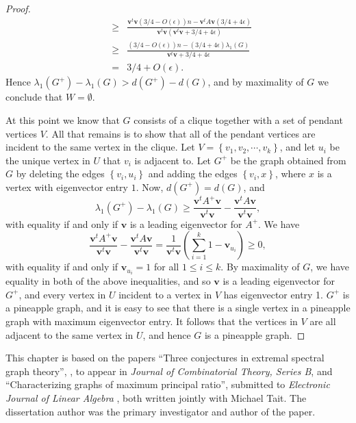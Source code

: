 \begin{proof}
\begin{eqnarray*}
 &\geq& \frac{\textbf{v}^t\textbf{v}(3/4-O(\epsilon))n - \textbf{v}^tA\textbf{v} (3/4 + 4\epsilon)}{\textbf{v}^t\textbf{v} (\textbf{v}^t\textbf{v} + 3/4 + 4\epsilon)}\\
 &\geq & \frac{(3/4-O(\epsilon))n - (3/4 + 4\epsilon)\lambda_1(G)}{\textbf{v}^t\textbf{v} + 3/4 + 4\epsilon} \\ 
 &= &  3/4 + O(\epsilon) .
\end{eqnarray*}
Hence $\lambda_1(G^+) - \lambda_1(G) > d(G^+) - d(G)$, and by maximality of $G$ we conclude that $W = \emptyset$.

At this point we know that $G$ consists of a clique together with a set of pendant vertices $V$.  All that remains is to show that all of the pendant vertices  are incident to the same vertex in the clique.  Let $V = \left\{v_1, v_2, \cdots, v_k\right\}$, and let $u_i$ be the unique vertex in $U$ that $v_i$ is adjacent to.  Let $G^+$ be the graph obtained from $G$ by deleting the edges $\left\{v_i,u_i\right\}$ and adding the edges $\left\{v_i,x\right\}$, where $x$ is a vertex with eigenvector entry $1$.  Now, $d(G^+) = d(G)$, and 
\[ \lambda_1(G^+) -\lambda_1(G) \geq \frac{\textbf{v}^t A^+ \textbf{v}}{\textbf{v}^t\textbf{v}} - \frac{\textbf{v}^t A \textbf{v}}{\textbf{v}^t\textbf{v}}, \]
with equality if and only if $\textbf{v}$ is a leading eigenvector for $A^+$.  We have
\[\frac{\textbf{v}^t A^+ \textbf{v}}{\textbf{v}^t\textbf{v}} - \frac{\textbf{v}^t A \textbf{v}}{\textbf{v}^t\textbf{v}} = \frac{1}{\textbf{v}^t\textbf{v}}\left( \sum_{i=1}^k 1 - \mathbf{v}_{u_i} \right) \geq 0 ,\]
with equality if and only if $\mathbf{v}_{u_i} = 1$ for all $1 \leq i \leq k$.  By maximality of $G$, we have equality in both of the above inequalities, and so $\textbf{v}$ is a leading eigenvector for $G^+$, and every vertex in $U$ incident to a vertex in $V$ has eigenvector entry 1.  $G^+$ is a pineapple graph, and it is easy to see that there is a single vertex in a pineapple graph with maximum eigenvector entry.  It follows that the vertices in $V$ are all adjacent to the same vertex in $U$, and hence $G$ is a pineapple graph.
\end{proof}


This chapter is based on the papers ``Three conjectures in extremal spectral graph theory'',
 \cite{TaitTobin2017}, to appear in \textit{Journal of Combinatorial Theory, Series B},
 and ``Characterizing graphs of maximum principal ratio'', submitted to
 \textit{Electronic Journal of Linear Algebra} \cite{TaitTobin2015},
both written jointly with Michael Tait.  The dissertation
author was the primary investigator and author of the paper.

